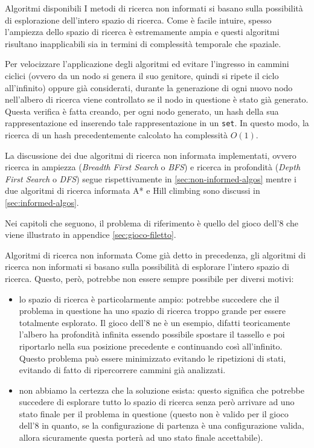 \begin{chapter}{Algoritmi disponibili}
I metodi di ricerca non informati si basano sulla possibilit\`a di esplorazione
dell'intero spazio di ricerca. Come \`e facile intuire, spesso l'ampiezza dello
spazio di ricerca \`e estremamente ampia e questi algoritmi risultano inapplicabili
sia in termini di complessit\`a temporale che spaziale.

Per velocizzare l'applicazione degli algoritmi ed evitare l'ingresso in cammini
ciclici (ovvero da un nodo si genera il suo genitore, quindi si ripete il ciclo
all'infinito) oppure gi\`a considerati, durante la generazione di ogni nuovo nodo
nell'albero di ricerca viene controllato se il nodo in questione \`e stato gi\`a
generato. Questa verifica \`e fatta creando, per ogni nodo generato, un hash della
sua rappresentazione ed inserendo tale rappresentazione in un \verb,set,. In questo
modo, la ricerca di un hash precedentemente calcolato ha complessit\`a $O(1)$.

La discussione dei due algoritmi di ricerca non informata implementati, ovvero
ricerca in ampiezza (\textit{Breadth First Search} o \textit{BFS}) e ricerca in
profondit\`a (\textit{Depth First Search} o \textit{DFS}) segue rispettivamente
in \ref{sec:non-informed-algos} mentre i due algoritmi di ricerca informata A* e
Hill climbing sono discussi in \ref{sec:informed-algos}.

Nei capitoli che seguono, il problema di riferimento \`e quello del gioco dell'8
che viene illustrato in appendice \ref{sec:gioco-filetto}.

\begin{section}{Algoritmi di ricerca non informata}
\label{sec:non-informed-algos}
Come gi\`a detto in precedenza, gli algoritmi di ricerca non informati si basano
sulla possibilit\`a di esplorare l'intero spazio di ricerca. Questo, per\`o, potrebbe
non essere sempre possibile per diversi motivi:

\begin{itemize}
    \item lo spazio di ricerca \`e particolarmente ampio: potrebbe succedere che
    il problema in questione ha uno spazio di ricerca troppo grande per essere
    totalmente esplorato. Il gioco dell'8 ne \`e un esempio, difatti teoricamente
    l'albero ha profondit\`a infinita essendo possibile spostare il tassello e poi
    riportarlo nella sua posizione precedente e continuando cos\`i all'infinito.
    Questo problema pu\`o essere minimizzato evitando le ripetizioni di stati,
    evitando di fatto di ripercorrere cammini gi\`a analizzati.
    \item non abbiamo la certezza che la soluzione esista: questo significa che
    potrebbe succedere di esplorare tutto lo spazio di ricerca senza per\`o
    arrivare ad uno stato finale per il problema in questione (questo non \`e
    valido per il gioco dell'8 in quanto, se la configurazione di partenza \`e
    una configurazione valida, allora sicuramente questa porter\`a ad uno stato
    finale accettabile).
\end{itemize}


\end{section}
\end{chapter}
